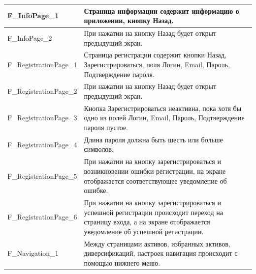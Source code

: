 \documentclass[a4paper, 14pt]{article}
\begin{document}
\begin{longtable}{| p{} | p{} |}
    F\_InfoPage\_1                  & Страница информации содержит информацию о приложении, кнопку Назад.                                                                                                                \\ \hline
    F\_InfoPage\_2                  & При нажатии на кнопку Назад будет открыт предыдущий экран.                                                                                                                         \\ \hline

    F\_RegistrationPage\_1          & Страница регистрации содержит кнопки Назад, Зарегистрироваться, поля Логин, Email, Пароль, Подтверждение пароля.                                                                   \\ \hline
    F\_RegistrationPage\_2          & При нажатии на кнопку Назад будет открыт предыдущий экран.                                                                                                                         \\ \hline
    F\_RegistrationPage\_3          & Кнопка Зарегистрироваться неактивна, пока хотя бы одно из полей Логин, Email, Пароль, Подтверждение пароля пустое.                                                                 \\ \hline
    F\_RegistrationPage\_4          & Длина пароля должна быть шесть или больше символов.                                                                                                                                \\ \hline
    F\_RegistrationPage\_5          & При нажатии на кнопку зарегистрироваться и возникновении ошибки регистрации, на экране отображается соответствующее уведомление об ошибке.                                         \\ \hline
    F\_RegistrationPage\_6          & При нажатии на кнопку зарегистрироваться и успешной регистрации происходит переход на страницу входа, а на экране отображается уведомление об успешной регистрации.                \\ \hline

    F\_Navigation\_1                & Между страницами активов, избранных активов, диверсификаций, настроек навигация происходит с помощью нижнего меню.                                                                 \\ \hline


\end{longtable}
\end{document}
